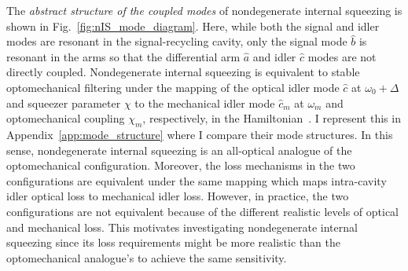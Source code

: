 The \emph{abstract structure of the coupled modes} of nondegenerate internal squeezing is shown in Fig.~\ref{fig:nIS_mode_diagram}. Here, while both the signal and idler modes are resonant in the signal-recycling cavity, only the signal mode $\hat b$ is resonant in the arms so that the differential arm $\hat a$ and idler $\hat c$ modes are not directly coupled. Nondegenerate internal squeezing is equivalent to stable optomechanical filtering under the mapping of the optical idler mode $\hat c$ at $\omega_0+\Delta$ and squeezer parameter $\chi$ to the mechanical idler mode $\hat{c}_m$ at $\omega_m$ and optomechanical coupling $\chi_m$, respectively, in the Hamiltonian~\cite{liBroadbandSensitivityImprovement2020}. I represent this in Appendix~\ref{app:mode_structure} where I compare their mode structures. In this sense, nondegenerate internal squeezing is an all-optical analogue of the optomechanical configuration.
Moreover, the loss mechanisms in the two configurations are equivalent under the same mapping which maps intra-cavity idler optical loss to mechanical idler loss. However, in practice, the two configurations are not equivalent because of the different realistic levels of optical and mechanical loss. This motivates investigating nondegenerate internal squeezing since its loss requirements might be more realistic than the optomechanical analogue's to achieve the same sensitivity. %


